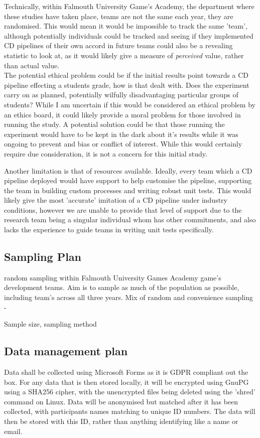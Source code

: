 \documentclass[lettersize,journal]{IEEEtran}
\begin{document}
        Technically, within Falmouth University Game's Academy, the department where these studies have taken place, teams are not the same each year, they are randomised. This would mean it would be impossible to track the same 'team', although potentially individuals could be tracked and seeing if they implemented CD pipelines of their own accord in future teams could also be a revealing statistic to look at, as it would likely give a measure of \textit{perceived} value, rather than actual value. \\
        The potential ethical problem could be if the initial results point towards a CD pipeline effecting a students grade, how is that dealt with. Does the experiment carry on as planned, potentially wilfully disadvantaging particular groups of students? While I am uncertain if this would be considered an ethical problem by an ethics board, it could likely provide a moral problem for those involved in running the study. A potential solution could be that those running the experiment would have to be kept in the dark about it's results while it was ongoing to prevent and bias or conflict of interest. While this would certainly require due consideration, it is not a concern for this initial study.

        Another limitation is that of resources available. Ideally, every team which a CD pipeline deployed would have support to help customise the pipeline, supporting the team in building custom processes and writing robust unit tests. This would likely give the most 'accurate' imitation of a CD pipeline under industry conditions, however we are unable to provide that level of support due to the research team being a singular individual whom has other commitments, and also lacks the experience to guide teams in writing unit tests specifically.
    
    \subsection{Sampling Plan}
        random sampling within Falmouth University Games Academy game's development teams. Aim is to sample as much of the population as possible, including team's across all three years. Mix of random and convenience sampling - 

        Sample size, sampling method
    
    \subsection{Data management plan}
        Data shall be collected using Microsoft Forms as it is GDPR compliant out the box. For any data that is then stored locally, it will be encrypted using GnuPG \cite{encryption} using a SHA256 cipher, with the unencrypted files being deleted using the 'shred' command on Linux.
        Data will be anonymised but matched after it has been collected, with participants names matching to unique ID numbers. The data will then be stored with this ID, rather than anything identifying like a name or email.
    
\end{document}
